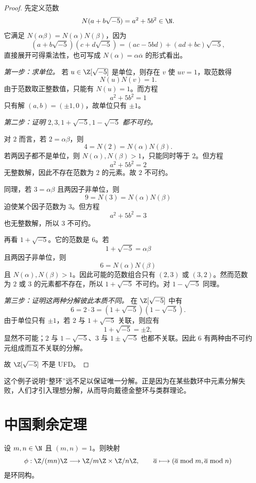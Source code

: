 \begin{proof}
先定义范数
\[
N(a+b\sqrt{-5})=a^2+5b^2\in \N.
\]
它满足 $N(\alpha\beta)=N(\alpha)N(\beta)$，因为
\[
(a+b\sqrt{-5})(c+d\sqrt{-5})=(ac-5bd)+(ad+bc)\sqrt{-5},
\]
直接展开可得乘法性，也可写成 $N(\alpha)=\alpha\overline{\alpha}$ 的形式看出。

\emph{第一步：求单位。} 若 $u\in\Z[\sqrt{-5}]$ 是单位，则存在 $v$ 使 $uv=1$，取范数得
\[
N(u)N(v)=1.
\]
由于范数取正整数值，只能有 $N(u)=1$。而方程
\[
a^2+5b^2=1
\]
只有解 $(a,b)=(\pm1,0)$，故单位只有 $\pm1$。

\emph{第二步：证明 $2,3,1+\sqrt{-5},1-\sqrt{-5}$ 都不可约。}

对 $2$ 而言，若 $2=\alpha\beta$，则
\[
4=N(2)=N(\alpha)N(\beta).
\]
若两因子都不是单位，则 $N(\alpha),N(\beta)>1$，只能同时等于 $2$。但方程
\[
a^2+5b^2=2
\]
无整数解，因此不存在范数为 $2$ 的元素。故 $2$ 不可约。

同理，若 $3=\alpha\beta$ 且两因子非单位，则
\[
9=N(3)=N(\alpha)N(\beta)
\]
迫使某个因子范数为 $3$。但方程
\[
a^2+5b^2=3
\]
也无整数解，所以 $3$ 不可约。

再看 $1+\sqrt{-5}$。它的范数是 $6$。若
\[
1+\sqrt{-5}=\alpha\beta
\]
且两因子非单位，则
\[
6=N(\alpha)N(\beta)
\]
且 $N(\alpha),N(\beta)>1$。因此可能的范数组合只有 $(2,3)$ 或 $(3,2)$。然而范数为 $2$ 或 $3$ 的元素都不存在，所以 $1+\sqrt{-5}$ 不可约。对 $1-\sqrt{-5}$ 同理。

\emph{第三步：证明这两种分解彼此本质不同。} 在 $\Z[\sqrt{-5}]$ 中有
\[
6=2\cdot 3=(1+\sqrt{-5})(1-\sqrt{-5}).
\]
由于单位只有 $\pm1$，若 $2$ 与 $1+\sqrt{-5}$ 关联，则应有
\[
1+\sqrt{-5}=\pm 2,
\]
显然不可能；$2$ 与 $1-\sqrt{-5}$、$3$ 与 $1\pm\sqrt{-5}$ 也都不关联。因此 $6$ 有两种由不可约元组成而互不关联的分解。

故 $\Z[\sqrt{-5}]$ 不是 UFD。
\end{proof}

\begin{remark}
这个例子说明“整环”远不足以保证唯一分解。正是因为在某些数环中元素分解失败，人们才引入理想分解，从而导向戴德金整环与类群理论。
\end{remark}

\section{中国剩余定理}

\begin{theorem}[整数情形的中国剩余定理]
设 $m,n\in\N$ 且 $(m,n)=1$。则映射
\[
\phi:\Z/(mn)\Z\longrightarrow \Z/m\Z\times \Z/n\Z,
\qquad
\overline{a}\longmapsto (\overline{a}\bmod m,\overline{a}\bmod n)
\]
是环同构。
\end{theorem}

